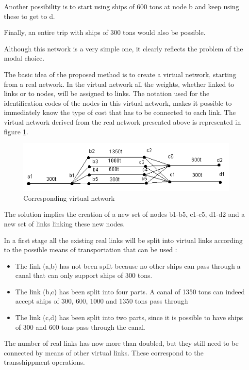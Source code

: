 Another possibility is to start using ships of 600 tons at node b and keep using
these to get to d.

Finally, an entire trip with ships of 300 tons would also be possible.

Although this network is a very simple one, it clearly reflects the problem of
the modal choice.

The basic idea of the proposed method is to create a virtual network, starting
from a real network.  In the virtual network all the weights, whether linked to
links or to nodes, will be assigned to links.  The notation used for the
identification codes of the nodes in this virtual network, makes it possible to
immediately know the type of cost that has to be connected to each link.  The virtual network derived from the real network presented above is represented in
figure \ref{f3_2}.


\begin{figure}[htbp]
\centerline{\includegraphics[width=12cm]{f3_2.png}}
\caption{\label{f3_2} Corresponding virtual network}
\end{figure}


The solution implies the creation of a new set of nodes b1-b5, c1-c5, d1-d2 and a new
set of links linking these new nodes.

In a first stage all the existing real links will be split into virtual links
according to the possible means of transportation that can be used :


\begin{itemize}
\item The link (a,b) has not been split because no other ships can pass through a
canal that can only support ships of 300 tons.
\item The link (b,c) has been split into four parts.  A canal of 1350 tons can indeed
accept ships of 300, 600, 1000 and 1350 tons pass through
\item The link (c,d) has been split into two parts, since it is possible to have
ships of 300 and 600 tons pass through the canal.
\end{itemize}


The number of real links has now more than doubled, but they still need to be connected
by means of other virtual links.  These correspond to the transshippment operations.

